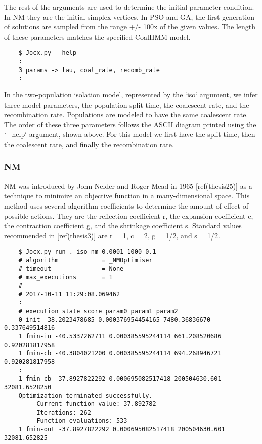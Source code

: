 The rest of the arguments are used to determine the initial parameter condition.
In NM they are the initial simplex vertices. In PSO and GA, the first generation
of solutions are sampled from the range +/- 100x of the given values. The length
of these parameters matches the specified CoalHMM model.

{\small{}\begin{verbatim}
    $ Jocx.py --help
    :
    3 params -> tau, coal_rate, recomb_rate
    :
\end{verbatim}}

In the two-population isolation model, represented by the ‘iso‘ argument, we
infer three model parameters, the population split time, the coalescent rate,
and the recombination rate. Populations are modeled to have the same coalescent
rate. The order of these three parameters follows the ASCII diagram printed
using the ‘– help‘ argument, shown above. For this model we first have the split
time, then the coalescent rate, and finally the recombination rate.

\subsubsection{NM}

NM was introduced by John Nelder and Roger Mead in 1965 [ref(thesis25)] as a
technique to minimize an objective function in a many-dimensional space. This
method uses several algorithm coefficients to determine the amount of effect of
possible actions. They are the reflection coefficient r, the expansion
coefficient c, the contraction coefficient g, and the shrinkage coefficient s.
Standard values recommended in [ref(thesis3)] are r = 1, c = 2, g = 1/2, and s =
1/2.

{\small{}\begin{verbatim}
    $ Jocx.py run . iso nm 0.0001 1000 0.1
    # algorithm            = _NMOptimiser
    # timeout              = None
    # max_executions       = 1
    #
    # 2017-10-11 11:29:08.069462
    :
    # execution state score param0 param1 param2
    0 init -38.2023478685 0.000376954454165 7480.36836670 0.337649514816
    1 fmin-in -40.5337262711 0.000385595244114 661.208520686 0.920281817958
    1 fmin-cb -40.3804021200 0.000385595244114 694.268946721 0.920281817958
    :
    1 fmin-cb -37.8927822292 0.000695082517418 200504630.601 32081.6528250
    Optimization terminated successfully.
         Current function value: 37.892782
         Iterations: 262
         Function evaluations: 533
    1 fmin-out -37.8927822292 0.000695082517418 200504630.601 32081.652825
\end{verbatim}}

